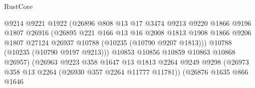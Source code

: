 \begin{lexlean}{RustCore}
\begin{coremodule}
                                          @9214
                                          @9221
                                          @1922
                                          (@26896
                                            @808
                                            @13
                                            @17
                                            @3474
                                            @9213
                                            @9220
                                            @1866
                                            @9196
                                            @1807
                                            @26916
                                            (@26895
                                              @221
                                              @166
                                              @13
                                              @16
                                              @2008
                                              @1813
                                              @1908
                                              @1866
                                              @9206
                                              @1807
                                              @27124
                                              @26937
                                              @10788
                                              (@10235 (@10790 @9207 @1813)))
                                            @10788
                                            (@10235 (@10790 @9197 @9213)))
                                          @10853
                                          @10856
                                          @10859
                                          @10863
                                          @10868
                                          @26957)
                                        (@26963
                                          @9223
                                          @358
                                          @1647
                                          @13
                                          @1813
                                          @2264
                                          @9249
                                          @9298
                                          (@26973 @358 @13 @2264 (@26930 @357 @2264 @11777 @11781))
                                          (@26876
                                            @1635
                                            @866
                                            @1646

\end{coremodule}
\end{lexlean}
